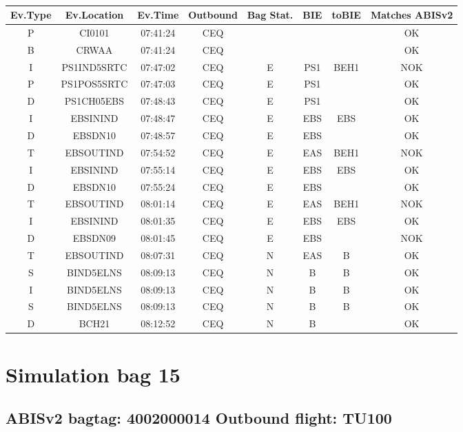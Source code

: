 \documentclass{report}
\begin{document}
\paragraph{}
\begin{longtable}{cccccccc}    \toprule
\rowcolor{white!50}
\textbf{Ev.Type} & \textbf{Ev.Location} & \textbf{Ev.Time} & \textbf{Outbound} & \textbf{Bag Stat.} & \textbf{BIE} & \textbf{toBIE} & \textbf{Matches ABISv2} \\\midrule
P & CI0101 & 07:41:24  & CEQ &  &  &  & OK\\
B & CRWAA & 07:41:24  & CEQ &  &  &  & OK\\
I & PS1IND5SRTC & 07:47:02  & CEQ & E & PS1 & BEH1 & NOK\\
P & PS1POS5SRTC & 07:47:03  & CEQ & E & PS1 &  & OK\\
D & PS1CH05EBS & 07:48:43  & CEQ & E & PS1 &  & OK\\
I & EBSININD & 07:48:47  & CEQ & E & EBS & EBS & OK\\
D & EBSDN10 & 07:48:57  & CEQ & E & EBS &  & OK\\
T & EBSOUTIND & 07:54:52  & CEQ & E & EAS & BEH1 & NOK\\
I & EBSININD & 07:55:14  & CEQ & E & EBS & EBS & OK\\
D & EBSDN10 & 07:55:24  & CEQ & E & EBS &  & OK\\
T & EBSOUTIND & 08:01:14  & CEQ & E & EAS & BEH1 & NOK\\
I & EBSININD & 08:01:35  & CEQ & E & EBS & EBS & OK\\
D & EBSDN09 & 08:01:45  & CEQ & E & EBS &  & NOK\\
T & EBSOUTIND & 08:07:31  & CEQ & N & EAS & B & OK\\
S & BIND5ELNS & 08:09:13  & CEQ & N & B & B & OK\\
I & BIND5ELNS & 08:09:13  & CEQ & N & B & B & OK\\
S & BIND5ELNS & 08:09:13  & CEQ & N & B & B & OK\\
D & BCH21 & 08:12:52  & CEQ & N & B &  & OK\\
\bottomrule
\end{longtable}
\pagebreak
\section*{Simulation bag 15}
\subsection*{ABISv2 bagtag: 4002000014 Outbound flight: TU100}
\end{document}
